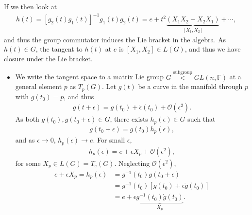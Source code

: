 If we then look at
\begin{align}
    h \left( t \right) = \left[ g_2 \left( t \right) g_1\left( t \right)  \right]^{-1} g_1\left( t \right) g_2\left( t \right) = e + t^2 \underbrace{\left( X_1 X_2 - X_2 X_1 \right)}_{\left[ X_1, X_2 \right] }  + \cdots
,\end{align}
and thus the group commutator induces the Lie bracket in the algebra. As $h \left( t \right) \in G$, the tangent to $h\left( t \right)$ at $e$ is $\left[ X_1, X_2 \right] \in L \left( G \right) $, and thus we have closure under the Lie bracket.

\begin{itemize}
    \item We write the tangent space to a matrix Lie group $G \overset{\text{subgroup}}{<} GL \left( n, \mathbb{F} \right) $ at a general element $p$ as $T_{p} \left( G \right) $. Let $g \left( t \right) $ be a curve in the manifold through $p$ with $g \left( t_0 \right) = p$, and thus
        \begin{align}
            g \left( t + \epsilon \right) = g\left( t_0 \right) + \dot{\epsilon}\left( t_0 \right) + \mathcal{O}\left( \epsilon^2 \right) 
        .\end{align}
        As both $g \left( t_0 \right), g\left( t_0 + \epsilon \right) \in G$, there exists $h_p \left( \epsilon \right) \in G $ such that
        \begin{align}
            g \left( t_0 + \epsilon \right) = g \left( t_0 \right) h_p \left( \epsilon \right) 
        ,\end{align}
        and as $\epsilon \to 0$, $h_p \left( \epsilon \right) \to e$. For small $\epsilon$,
        \begin{align}
            h_p \left( \epsilon \right) = e + \epsilon X_p + \mathcal{O}\left( \epsilon^2 \right) 
        ,\end{align}
        for some $X_p \in L \left( G \right) = T_e \left( G \right)  $. Neglecting $\mathcal{O}\left( \epsilon^2 \right) $,
        \begin{align}
            e + \epsilon X_p = h_p \left( \epsilon \right) &= g^{-1}\left( t_0 \right) g\left( t_0 + \epsilon \right)  \\
            &= g^{-1} \left( t_0 \right) \left[ g \left( t_0 \right) + \epsilon \dot{g}\left( t_0 \right)  \right]   \\
            &= e + \epsilon \underbrace{g^{-1}\left( t_0 \right) \dot{g}\left( t_0 \right)}_{X_p}
        .\end{align}

\end{itemize}

